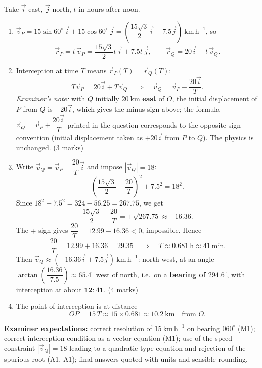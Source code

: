 \documentclass[11pt]{article}
\begin{document}
\begin{corrige}
Take $\vec{i}$ east, $\vec{j}$ north, $t$ in hours after noon.
\begin{enumerate}
\item $\vec{v}_P = 15\sin 60^{\circ}\,\vec{i} + 15\cos 60^{\circ}\,\vec{j} = \left(\dfrac{15\sqrt{3}}{2}\vec{i} + 7.5\vec{j}\right)\ \mathrm{km\,h^{-1}}$, so
\[
\vec{r}_P = t\,\vec{v}_P = \frac{15\sqrt{3}}{2}t\,\vec{i} + 7.5t\,\vec{j}, \qquad
\vec{r}_Q = 20\vec{i} + t\,\vec{v}_Q. \tag{3 marks}
\]
\item Interception at time $T$ means $\vec{r}_P(T) = \vec{r}_Q(T)$:
\[
T\vec{v}_P = 20\vec{i} + T\vec{v}_Q
\quad\Longrightarrow\quad
\vec{v}_Q = \vec{v}_P - \frac{20\vec{i}}{T}.
\]
\emph{Examiner's note:} with $Q$ initially $20\ \mathrm{km}$ \textbf{east} of $O$, the initial displacement of $P$ from $Q$ is $-20\vec{i}$, which gives the minus sign above; the formula $\vec{v}_Q = \vec{v}_P + \dfrac{20\vec{i}}{T}$ printed in the question corresponds to the opposite sign convention (initial displacement taken as $+20\vec{i}$ from $P$ to $Q$). The physics is unchanged. \hfill (3 marks)
\item Write $\vec{v}_Q = \vec{v}_P - \dfrac{20}{T}\vec{i}$ and impose $|\vec{v}_Q| = 18$:
\[
\left(\frac{15\sqrt{3}}{2} - \frac{20}{T}\right)^{2} + 7.5^{2} = 18^{2}.
\]
Since $18^2 - 7.5^2 = 324 - 56.25 = 267.75$, we get
\[
\frac{15\sqrt{3}}{2} - \frac{20}{T} = \pm\sqrt{267.75} \approx \pm 16.36.
\]
The $+$ sign gives $\dfrac{20}{T} = 12.99 - 16.36 < 0$, impossible. Hence
\[
\frac{20}{T} = 12.99 + 16.36 = 29.35 \quad\Longrightarrow\quad T \approx 0.681\ \mathrm{h} \approx 41\ \mathrm{min}.
\]
Then $\vec{v}_Q \approx (-16.36\vec{i} + 7.5\vec{j})\ \mathrm{km\,h^{-1}}$: north-west, at an angle $\arctan\!\left(\dfrac{16.36}{7.5}\right) \approx 65.4^{\circ}$ west of north, i.e.\ on a \textbf{bearing of $294.6^{\circ}$}, with interception at about $\mathbf{12{:}41}$. \hfill (4 marks)
\item The point of interception is at distance
\[
OP = 15\,T \approx 15 \times 0.681 \approx 10.2\ \mathrm{km} \quad \text{from } O. \tag{2 marks}
\]
\end{enumerate}
\textbf{Examiner expectations:} correct resolution of $15\ \mathrm{km\,h^{-1}}$ on bearing $060^{\circ}$ (M1); correct interception condition as a vector equation (M1); use of the speed constraint $|\vec{v}_Q| = 18$ leading to a quadratic-type equation and rejection of the spurious root (A1, A1); final answers quoted with units and sensible rounding.
\end{corrige}
\end{document}
